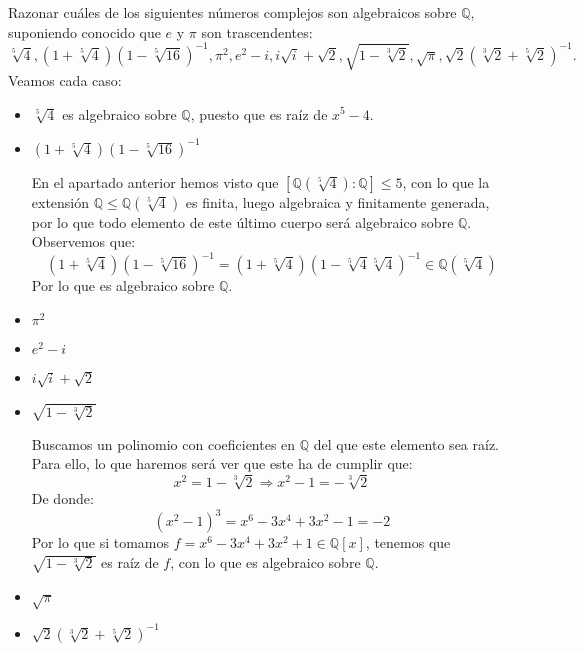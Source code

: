 \begin{ejercicio} 
    Razonar cuáles de los siguientes números complejos son algebraicos sobre $\mathbb{Q}$, suponiendo conocido que $e$ y $\pi$ son trascendentes:
    \begin{equation*}
        \sqrt[5]{4}, (1+\sqrt[5]{4}){(1-\sqrt[5]{16})}^{-1}, \pi^2, e^2-i, i\sqrt{i}+\sqrt{2}, \sqrt{1-\sqrt[3]{2}}, \sqrt{\pi}, \sqrt{2}{(\sqrt[3]{2}+\sqrt[5]{2})}^{-1}.
    \end{equation*}
    Veamos cada caso:
    \begin{itemize}
        \item $\sqrt[5]{4}$ es algebraico sobre $\mathbb{Q}$, puesto que es raíz de $x^5-4$.
        \item $\left(1+\sqrt[5]{4}\right){\left(1-\sqrt[5]{16}\right)}^{-1}$

            En el apartado anterior hemos visto que $[\mathbb{Q}\left(\sqrt[5]{4}\right) :\mathbb{Q}]\leq 5$, con lo que la extensión $\mathbb{Q}\leq \mathbb{Q}\left(\sqrt[5]{4}\right)$ es finita, luego algebraica y finitamente generada, por lo que todo elemento de este último cuerpo será algebraico sobre $\mathbb{Q}$. Observemos que:
            \begin{equation*}
                (1+\sqrt[5]{4}){\left(1-\sqrt[5]{16}\right)}^{-1} = (1+\sqrt[5]{4}){\left(1-\sqrt[5]{4}\sqrt[5]{4}\right)}^{-1} \in \mathbb{Q}(\sqrt[5]{4})
            \end{equation*}
            Por lo que es algebraico sobre $\mathbb{Q}$.
        \item $\pi^2$%
        \item $e^2-i$ %
        \item $i\sqrt{i}+\sqrt{2}$ %
        \item $\sqrt{1-\sqrt[3]{2}}$

            Buscamos un polinomio con coeficientes en $\mathbb{Q}$ del que este elemento sea raíz. Para ello, lo que haremos será ver que este ha de cumplir que:
            \begin{equation*}
                x^2 = 1-\sqrt[3]{2} \Longrightarrow x^2-1 = -\sqrt[3]{2}
            \end{equation*}
            De donde:
            \begin{equation*}
                {(x^2-1)}^{3} = x^6-3x^4+3x^2-1 = -2
            \end{equation*}
            Por lo que si tomamos $f = x^6-3x^4+3x^2+1\in \mathbb{Q}[x]$, tenemos que $\sqrt{1-\sqrt[3]{2}}$ es raíz de $f$, con lo que es algebraico sobre $\mathbb{Q}$.
        \item $\sqrt{\pi}$ %
        \item $\sqrt{2}{(\sqrt[3]{2}+\sqrt[5]{2})}^{-1}$ 


\end{itemize}
\end{ejercicio}
